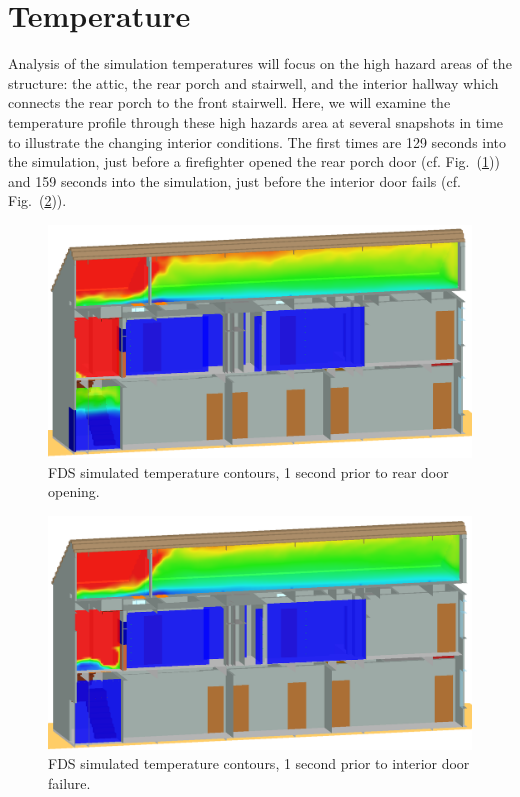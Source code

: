 \documentclass[11pt,oneside]{book}
\begin{document}
\section{Temperature}
\label{temp}
Analysis of the simulation temperatures will focus on the high hazard areas of the structure: the attic, the rear porch and stairwell, and the interior hallway which connects the rear porch to the front stairwell. Here, we will examine the temperature profile through these high hazards area at several snapshots in time to illustrate the changing interior conditions. The first times are 129 seconds into the simulation, just before a firefighter opened the rear porch door (cf. Fig.~(\ref{fig:temp_129s})) and 159 seconds into the simulation, just before the interior door fails (cf. Fig.~(\ref{fig:temp_159s})).

\begin{figure}[!ht]
\includegraphics[width=.675\textwidth]{../Figures/west_50th_baseline_129}
 

\caption{FDS simulated temperature contours, 1 second prior to rear door opening.}
\label{fig:temp_129s}
\end{figure}

\begin{figure}[!ht]
\includegraphics[width=.675\textwidth]{../Figures/west_50th_baseline_159}
 

\caption{FDS simulated temperature contours, 1 second prior to interior door failure.}
\label{fig:temp_159s}
\end{figure}
\end{document}
